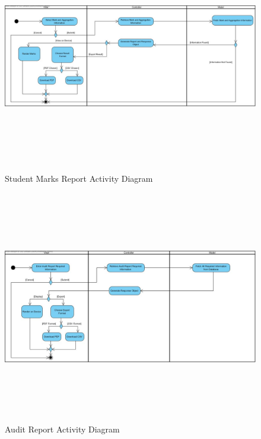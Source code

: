 \documentclass[12pt]{article}
\begin{document}
						\begin{figure}[h]
										\centering
										\includegraphics[width=6in, height=4in]{Pictures/StudentMarksReport.jpg}
										\caption{Student Marks Report Activity Diagram}
						\end{figure}
						\FloatBarrier
						\begin{figure}[h]
										\centering
										\includegraphics[width=6in, height=4in]{Pictures/AuditReportActivityDiagram.jpg}
										\caption{Audit Report Activity Diagram}
						\end{figure}
				\vspace{0.2in}
		
\end{document}
